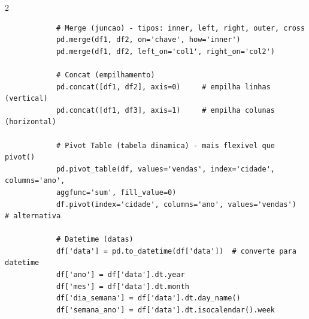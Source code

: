 \documentclass[a4paper]{article}
\begin{document}
\begin{multicols}{2}
\begin{lstlisting}
			# Merge (juncao) - tipos: inner, left, right, outer, cross
			pd.merge(df1, df2, on='chave', how='inner')
			pd.merge(df1, df2, left_on='col1', right_on='col2')
			
			# Concat (empilhamento)
			pd.concat([df1, df2], axis=0)     # empilha linhas (vertical)
			pd.concat([df1, df3], axis=1)     # empilha colunas (horizontal)
			
			# Pivot Table (tabela dinamica) - mais flexivel que pivot()
			pd.pivot_table(df, values='vendas', index='cidade', columns='ano', 
			aggfunc='sum', fill_value=0)
			df.pivot(index='cidade', columns='ano', values='vendas')  # alternativa
			
			# Datetime (datas)
			df['data'] = pd.to_datetime(df['data'])  # converte para datetime
			df['ano'] = df['data'].dt.year
			df['mes'] = df['data'].dt.month
			df['dia_semana'] = df['data'].dt.day_name()
			df['semana_ano'] = df['data'].dt.isocalendar().week
		\end{lstlisting}
		
		
	\end{multicols}
\end{document}
